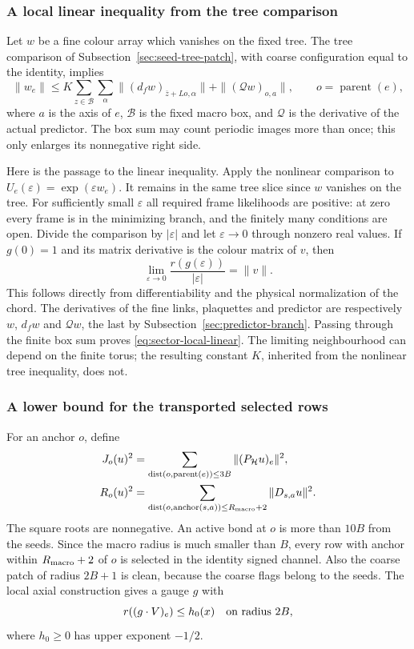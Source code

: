 \subsubsection{A local linear inequality from the tree comparison}
Let $w$ be a fine colour array which vanishes on the fixed tree.
The tree comparison of Subsection~\ref{sec:seed-tree-patch}, with
coarse configuration equal to the identity, implies
\begin{equation}\label{eq:sector-local-linear}
 \|w_e\|\le K\sum_{z\in\mathcal B}\sum_\alpha
       \|(d_fw)_{\overline z+L o,\alpha}\|
           +\|(\mathcal Qw)_{o,a}\|,
 \qquad o=\operatorname{parent}(e),
\end{equation}
where $a$ is the axis of $e$, $\mathcal B$ is the fixed macro box,
and $\mathcal Q$ is the derivative of the actual predictor.
The box sum may count periodic images more than once; this only
enlarges its nonnegative right side.

Here is the passage to the linear inequality. Apply the nonlinear
comparison to $U_e(\varepsilon)=\exp(\varepsilon w_e)$.
It remains in the same tree slice since $w$ vanishes on the tree.
For sufficiently small $\varepsilon$ all required frame
likelihoods are positive: at zero every frame is in the minimizing
branch, and the finitely many conditions are open. Divide the
comparison by $|\varepsilon|$ and let $\varepsilon\to0$ through
nonzero real values. If $g(0)=1$ and its matrix derivative is the
colour matrix of $v$, then
\[
 \lim_{\varepsilon\to0}
 \frac{r(g(\varepsilon))}{|\varepsilon|}=\|v\|.
\]
This follows directly from differentiability and the physical
normalization of the chord. The derivatives of the fine links,
plaquettes and predictor are respectively $w$, $d_fw$ and
$\mathcal Qw$, the last by Subsection~\ref{sec:predictor-branch}.
Passing through the finite box sum proves
\eqref{eq:sector-local-linear}. The limiting neighbourhood can
depend on the finite torus; the resulting constant $K$, inherited
from the nonlinear tree inequality, does not.

\subsubsection{A lower bound for the transported selected rows}
For an anchor $o$, define
\[
 \begin{split}
 J_o(u)^2&=\sum_{\operatorname{dist}(o,\operatorname{parent}(e))
                         \le3B}\|(P_{\mathcal H}u)_e\|^2,\\
 R_o(u)^2&=\sum_{\operatorname{dist}(o,\operatorname{anchor}(s,a))
                         \le R_{\rm macro}+2}\|D_{s,a}u\|^2.
 \end{split}
\]
The square roots are nonnegative. An active bond at $o$ is more
than $10B$ from the seeds. Since the macro radius is much smaller
than $B$, every row with anchor within $R_{\rm macro}+2$ of $o$
is selected in the identity signed channel. Also the coarse patch
of radius $2B+1$ is clean, because the coarse flags belong to the
seeds. The local axial construction gives a gauge $g$ with
\[
 r((g\cdot V)_e)\le h_0(x)
 \quad\hbox{on radius }2B,
\]
where $h_0\ge0$ has upper exponent $-1/2$.

